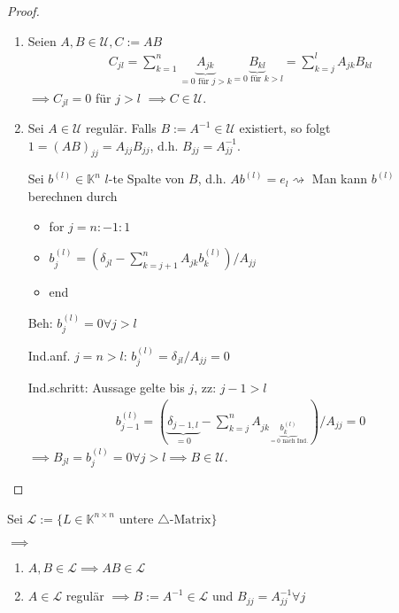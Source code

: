 \begin{proof}
	\begin{enumerate}
		\item Seien $A, B \in \mathcal{U}, C := AB$
		\begin{align*}
			C_{jl} = \sum_{k=1}^{n} \underbrace{A_{jk}}_{=0 \text{ für } j > k} \underbrace{B_{kl}}_{=0 \text{ für } k > l} = \sum_{k=j}^{l} A_{jk} B_{kl}
		\end{align*}
		$\implies C_{jl} = 0$ für $j > l$ $\implies C \in \mathcal{U}$.
		
		\item Sei $A \in \mathcal{U}$ regulär. Falls $B := A^{-1} \in \mathcal{U}$ existiert, so folgt $1 = (AB)_{jj} = A_{jj} B_{jj}$, d.h. $B_{jj} = A_{jj}^{-1}$.
		
		Sei $b^{(l)} \in \mathbb{K}^n$ $l$-te Spalte von $B$, d.h. $Ab^{(l)} = e_l \rightsquigarrow$ Man kann $b^{(l)}$ berechnen durch
		\begin{itemize}
			\item for $j=n:-1:1$
			\item \hspace{0.5cm} $b_j^{(l)} = \left(\delta_{jl} - \sum_{k=j+1}^{n} A_{jk} b_k^{(l)}\right) / A_{jj}$
			\item end
		\end{itemize}
		
		Beh: $b_j^{(l)} = 0 \forall j > l$
		
		Ind.anf. $j=n>l$: $b_j^{(l)} = \delta_{jl} / A_{jj} = 0$
		
		Ind.schritt: Aussage gelte bis $j$, zz: $j-1>l$
		\begin{align*}
			b_{j-1}^{(l)} = \left( \underbrace{\delta_{j-1,l}}_{=0} - \sum_{k=j}^{n} A_{jk \underbrace{b_k^{(l)}}_{=0 \text{ nach Ind.}}} \right) / A_{jj} = 0
		\end{align*}
		$\implies B_{jl} = b_j^{(l)} = 0 \forall j > l \implies B \in \mathcal{U}$.
	\end{enumerate}
\end{proof}

\begin{corollary}
	Sei $\mathcal{L} := \{L \in \mathbb{K}^{n\times n} \text{ untere } \triangle\text{-Matrix}\}$
	
	$\implies$
	\begin{enumerate}
		\item $A, B \in \mathcal{L} \implies AB \in \mathcal{L}$
		\item $A \in \mathcal{L}$ regulär $\implies B:=A^{-1} \in \mathcal{L}$ und $B_{jj}=A_{jj}^{-1} \forall j$
	\end{enumerate}
\end{corollary}

